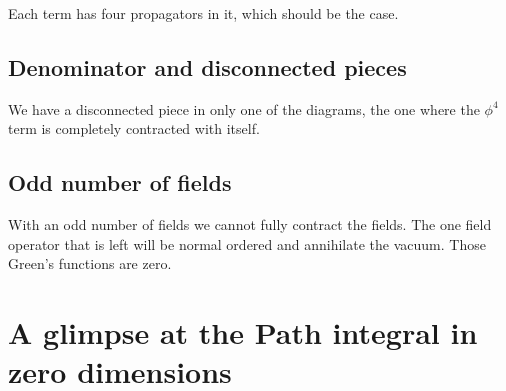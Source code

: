\documentclass[11pt, english, fleqn, DIV=15, headinclude, BCOR=1cm]{scrartcl}
\begin{document}
Each term has four propagators in it, which should be the case.

\subsection{Denominator and disconnected pieces}

We have a disconnected piece in only one of the diagrams, the one where the
$\phi^4$ term is completely contracted with itself.

\subsection{Odd number of fields}

With an odd number of fields we cannot fully contract the fields. The one field
operator that is left will be normal ordered and annihilate the vacuum. Those
Green's functions are zero.
\section{A glimpse at the Path integral in zero dimensions}
\label{homework:2}
\end{document}
